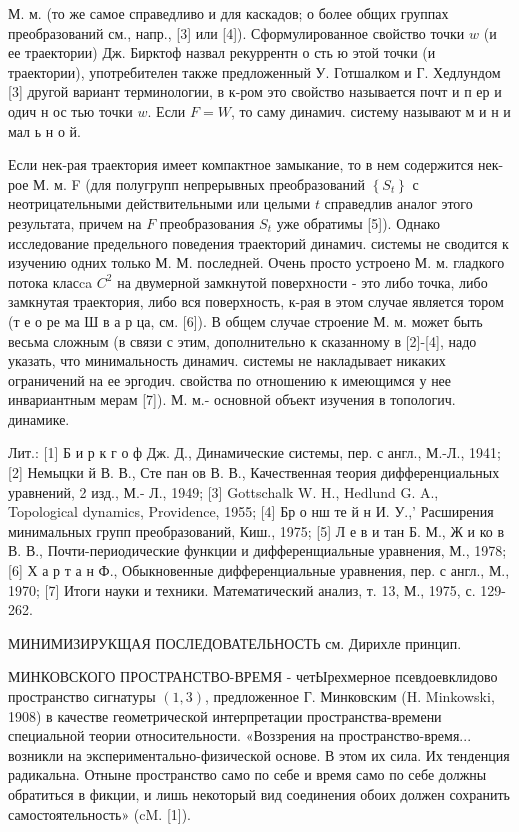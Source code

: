 \documentclass[10pt]{article}
\begin{document}
М. м. (то же самое справедливо и для каскадов; о более общих группах преобразований см., напр., [3] или [4]). Сформулированное свойство точки $w$ (и ее траектории) Дж. Бирктоф назвал рекуррентн о сть ю этой точки (и траектории), употребителен также предложенный У. Готшалком и Г. Хедлундом [3] другой вариант терминологии, в к-ром это свойство называется почт и п ер и одич н ос тью точки $w$. Если $F=W$, то саму динамич. систему называют м и н и мал ь н о й.



Если нек-рая траектория имеет компактное замыкание, то в нем содержится нек-рое М. м. F (для полугрупп непрерывных преобразований $\left\{S_{t}\right\}$ с неотрицательными действительными или целыми $t$ справедлив аналог этого результата, причем на $F$ преобразования $S_{t}$ уже обратимы [5]). Однако исследование предельного поведения траекторий динамич. системы не сводится к изучению одних только М. М. последней. Очень просто устроено М. м. гладкого потока класca $C^{2}$ на двумерной замкнутой поверхности - это либо точка, либо замкнутая траектория, либо вся поверхность, к-рая в этом случае является тором (т е о ре ма Ш в а р ца, см. [6]). В общем случае строение М. м. может быть весьма сложным (в связи с этим, дополнительно к сказанному в [2]-[4], надо указать, что минимальность динамич. системы не накладывает никаких ограничений на ее эргодич. свойства по отношению к имеющимся у нее инвариантным мерам [7]). М. м.- основной объект изучения в топологич. динамике.



Лит.: [1] Б и р к г о ф Дж. Д., Динамические системы, пер. с англ., М.-Л., 1941; [2] Немыцки й В. В., Сте пан ов В. В., Качественная теория дифференциальных уравнений, 2 изд., М.- Л., 1949; [3] Gottschalk W. H., Hedlund G. A., Topological dynamics, Providence, 1955; [4] Бр о нш те й н И. У.,' Расширения минимальных групп преобразований, Киш., 1975; [5] Л е в и тан Б. М., Ж и ко в В. В., Почти-периодические функции и дифференщиальные уравнения, М., 1978; [6] Х а р т а н Ф., Обыкновенные дифференциальные уравнения, пер. с англ., М., 1970; [7] Итоги науки и техники. Математический анализ, т. 13, М., 1975, с. 129-262.



МИНИМИЗИРУКЩАЯ ПОСЛЕДОВАТЕЛЬНОСТЬ см. Дирихле принцип.



МИНКОВСКОГО ПРОСТРАНСТВО-ВРЕМЯ - четЫрехмерное псевдоевклидово пространство сигнатуры $(1,3)$, предложенное Г. Минковским (H. Minkowski, 1908) в качестве геометрической интерпретации пространства-времени специальной теории относительности. «Воззрения на пространство-время... возникли на экспериментально-физической основе. В этом их сила. Их тенденция радикальна. Отныне пространство само по себе и время само по себе должны обратиться в фикции, и лишь некоторый вид соединения обоих должен сохранить самостоятельность» (cM. [1]).
\end{document}
